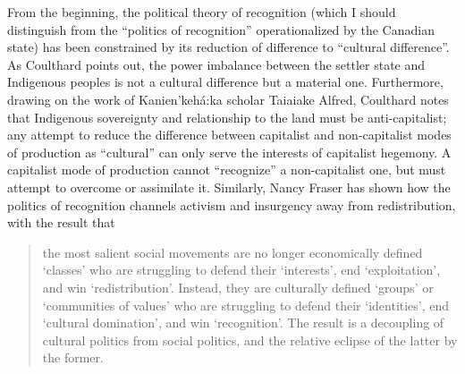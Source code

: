 \documentclass[12pt,oneside]{memoir}
\begin{document}
From the beginning, the political theory of recognition (which I should distinguish from the ``politics of recognition'' operationalized by the Canadian state) has been constrained by its reduction of difference to ``cultural difference''. As Coulthard points out, the power imbalance between the settler state and Indigenous peoples is not a cultural difference but a material one. Furthermore, drawing on the work of Kanien'kehá:ka scholar Taiaiake Alfred, Coulthard notes that   Indigenous sovereignty and relationship to the land must be anti-capitalist; any attempt to reduce the difference between capitalist and non-capitalist modes of production as ``cultural'' can only serve the interests of capitalist hegemony. A capitalist mode of production cannot ``recognize'' a non-capitalist one, but must attempt to overcome or assimilate it. 
Similarly, Nancy Fraser has shown how the politics of recognition channels activism and insurgency away from redistribution, with the result that 
\begin{quote}
the most salient social movements are no longer economically defined `classes' who are struggling to defend their `interests', end `exploitation', and win `redistribution'. Instead, they are culturally defined `groups' or `communities of values' who are struggling to defend their `identities', end `cultural domination', and win `recognition'. The result is a decoupling of cultural politics from social politics, and the relative eclipse of the latter by the former. \citep[2]{Fraser1997}
\end{quote}
\end{document}
